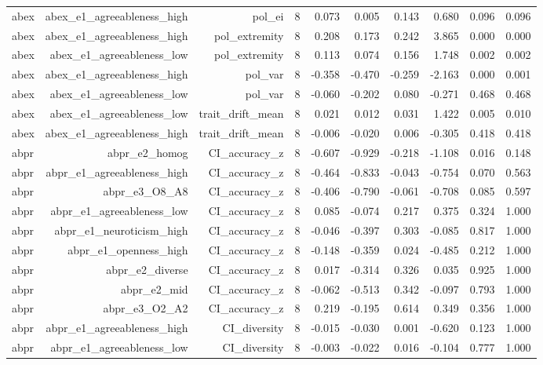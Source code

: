 \documentclass[11pt]{article}
\begin{document}
\begin{landscape}
\begin{longtable}{@{}lrrrrrrrrr@{}}
abex & abex\_e1\_agreeableness\_high & pol\_ei & 8 & 0.073 & 0.005 & 0.143 & 0.680 & 0.096 & 0.096 \\
abex & abex\_e1\_agreeableness\_high & pol\_extremity & 8 & 0.208 & 0.173 & 0.242 & 3.865 & 0.000 & 0.000 \\
abex & abex\_e1\_agreeableness\_low & pol\_extremity & 8 & 0.113 & 0.074 & 0.156 & 1.748 & 0.002 & 0.002 \\
abex & abex\_e1\_agreeableness\_high & pol\_var & 8 & -0.358 & -0.470 & -0.259 & -2.163 & 0.000 & 0.001 \\
abex & abex\_e1\_agreeableness\_low & pol\_var & 8 & -0.060 & -0.202 & 0.080 & -0.271 & 0.468 & 0.468 \\
abex & abex\_e1\_agreeableness\_low & trait\_drift\_mean & 8 & 0.021 & 0.012 & 0.031 & 1.422 & 0.005 & 0.010 \\
abex & abex\_e1\_agreeableness\_high & trait\_drift\_mean & 8 & -0.006 & -0.020 & 0.006 & -0.305 & 0.418 & 0.418 \\
abpr & abpr\_e2\_homog & CI\_accuracy\_z & 8 & -0.607 & -0.929 & -0.218 & -1.108 & 0.016 & 0.148 \\
abpr & abpr\_e1\_agreeableness\_high & CI\_accuracy\_z & 8 & -0.464 & -0.833 & -0.043 & -0.754 & 0.070 & 0.563 \\
abpr & abpr\_e3\_O8\_A8 & CI\_accuracy\_z & 8 & -0.406 & -0.790 & -0.061 & -0.708 & 0.085 & 0.597 \\
abpr & abpr\_e1\_agreeableness\_low & CI\_accuracy\_z & 8 & 0.085 & -0.074 & 0.217 & 0.375 & 0.324 & 1.000 \\
abpr & abpr\_e1\_neuroticism\_high & CI\_accuracy\_z & 8 & -0.046 & -0.397 & 0.303 & -0.085 & 0.817 & 1.000 \\
abpr & abpr\_e1\_openness\_high & CI\_accuracy\_z & 8 & -0.148 & -0.359 & 0.024 & -0.485 & 0.212 & 1.000 \\
abpr & abpr\_e2\_diverse & CI\_accuracy\_z & 8 & 0.017 & -0.314 & 0.326 & 0.035 & 0.925 & 1.000 \\
abpr & abpr\_e2\_mid & CI\_accuracy\_z & 8 & -0.062 & -0.513 & 0.342 & -0.097 & 0.793 & 1.000 \\
abpr & abpr\_e3\_O2\_A2 & CI\_accuracy\_z & 8 & 0.219 & -0.195 & 0.614 & 0.349 & 0.356 & 1.000 \\
abpr & abpr\_e1\_agreeableness\_high & CI\_diversity & 8 & -0.015 & -0.030 & 0.001 & -0.620 & 0.123 & 1.000 \\
abpr & abpr\_e1\_agreeableness\_low & CI\_diversity & 8 & -0.003 & -0.022 & 0.016 & -0.104 & 0.777 & 1.000 \\

\end{longtable}
\end{landscape}
\end{document}

